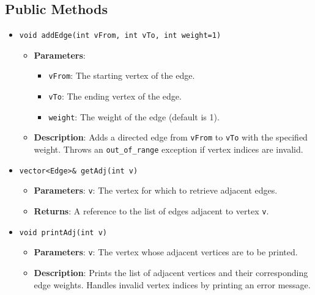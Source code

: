 \documentclass{article}
\begin{document}
\subsection{Public Methods}
\begin{itemize}
    \item \texttt{void addEdge(int vFrom, int vTo, int weight=1)}
    \begin{itemize}
        \item \textbf{Parameters}: 
        \begin{itemize}
            \item \texttt{vFrom}: The starting vertex of the edge.
            \item \texttt{vTo}: The ending vertex of the edge.
            \item \texttt{weight}: The weight of the edge (default is 1).
        \end{itemize}
        \item \textbf{Description}: Adds a directed edge from \texttt{vFrom} to \texttt{vTo} with the specified weight. Throws an \texttt{out\_of\_range} exception if vertex indices are invalid.
    \end{itemize}

    \item \texttt{vector<Edge>\& getAdj(int v)}
    \begin{itemize}
        \item \textbf{Parameters}: \texttt{v}: The vertex for which to retrieve adjacent edges.
        \item \textbf{Returns}: A reference to the list of edges adjacent to vertex \texttt{v}.
    \end{itemize}

    \item \texttt{void printAdj(int v)}
    \begin{itemize}
        \item \textbf{Parameters}: \texttt{v}: The vertex whose adjacent vertices are to be printed.
        \item \textbf{Description}: Prints the list of adjacent vertices and their corresponding edge weights. Handles invalid vertex indices by printing an error message.
    \end{itemize}


\end{itemize}
\end{document}
